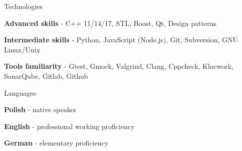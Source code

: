 


\begin{cvskills}

  \cvskill
    {Technologies}
    {
      \begin{cvitems}
        \item {\textbf{Advanced skills} - C++ 11/14/17, STL, Boost, Qt, Design patterns}
        \item {\textbf{Intermediate skills} - Python, JavaScript (Node.js), Git, Subversion, GNU Linux/Unix}
        \item {\textbf{Tools familiarity} - Gtest, Gmock, Valgrind, Clang, Cppcheck, Klocwork, SonarQube, Gitlab, Github}
      \end{cvitems}
    }


  \cvskill
    {Languages}
    {
      \begin{cvitems}
        \item {\textbf{Polish} - native speaker}
        \item {\textbf{English} - professional working proficiency}
        \item {\textbf{German} - elementary proficiency}
      \end{cvitems}
      }

\end{cvskills}
